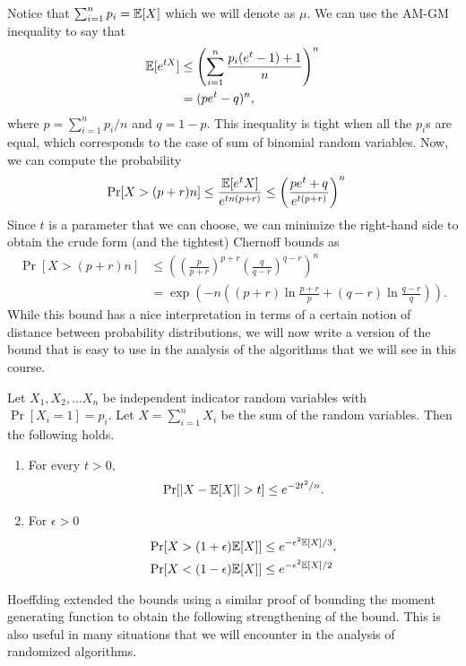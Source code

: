 Notice that $\sum_{i=1}^n p_i = \mathbb{E}[X]$ which we will denote as $\mu$. We can use the AM-GM inequality to say that
\begin{align*}
	\mathbb{E}[e^{tX}] &\leq \left( \sum_{i=1}^n \frac{p_i(e^t-1)+1}{n} \right)^n\\
	&= (pe^t-q)^n,
\end{align*}
where $p = \sum_{i=1}^n p_i/n$ and $q = 1-p$. This inequality is tight when all the $p_i$s are equal, which corresponds to the case of sum of binomial random variables. Now, we can compute the probability 
\begin{align*}
	\Pr[X > (p+r)n] &\leq \frac{\mathbb{E}[e^tX]}{e^{tn(p+r)}} \leq \left( \frac{pe^t+q}{e^{t(p+r)}} \right)^n
\end{align*}
Since $t$ is a parameter that we can choose, we can minimize the right-hand side to obtain the crude form (and the tightest) Chernoff bounds as
\begin{align*}
	\Pr[X > (p+r)n] &\leq \left(\left( \frac{p}{p+r} \right)^{p+r} \left( \frac{q}{q-r} \right)^{q-r} \right)^n \\
	&= \exp\left( -n \left( (p+r)\ln \frac{p+r}{p} + (q-r)\ln \frac{q-r}{q} \right) \right).
\end{align*}
While this bound has a nice interpretation in terms of a certain notion of distance between probability distributions, we will now write a version of the bound that is easy to use in the analysis of the algorithms that we will see in this course.

\begin{theorem}
	Let $X_1, X_2, \ldots X_n$ be independent indicator random variables with $\Pr[X_i=1] = p_i$. Let $X = \sum_{i=1}^n X_i$ be the sum of the random variables. Then the following holds.
	\begin{enumerate}
		\item For every $t >0$,
		\begin{align*}
			\Pr[|X -\mathbb{E}[X]| > t] \leq e^{-2t^2/n}.
		\end{align*}
		\item For $\epsilon >0$
		\begin{align*}
			\Pr[X > (1+\epsilon)\mathbb{E}[X]] &\leq e^{-\epsilon^2\mathbb{E}[X]/3}, \\
			\Pr[X < (1-\epsilon)\mathbb{E}[X]] &\leq e^{-\epsilon^2\mathbb{E}[X]/2}
		\end{align*}
	\end{enumerate}
	\label{thm:chernoff}
\end{theorem}

Hoeffding extended the bounds using a similar proof of bounding the moment generating function to obtain the following strengthening of the bound. This is also useful in many situations that we will encounter in the analysis of randomized algorithms.

